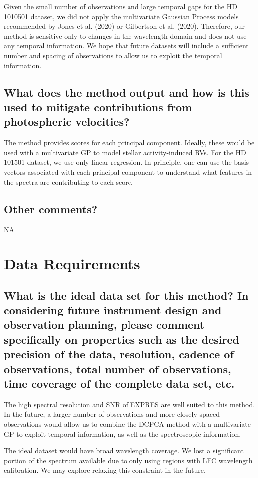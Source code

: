 \documentclass[12pt]{article}
\begin{document}
Given the small number of observations and large temporal gaps for the HD 1010501 dataset, we did not apply the multivariate Gaussian Process models recommended by Jones et al. (2020) or Gilbertson et al. (2020).
Therefore, our method is sensitive only to changes in the wavelength domain and does not use any temporal information.
We hope that future datasets will include a sufficient number and spacing of observations to allow us to exploit the temporal information.

\subsection{What does the method output and how is this used to mitigate contributions from photospheric velocities?}

The method provides scores for each principal component.  Ideally, these would be used with a multivariate GP to model stellar activity-induced RVs.  For the HD 101501 dataset, we use only linear regression.
In principle, one can use the basis vectors associated with each principal component to understand what features in the spectra are contributing to each score.

\subsection{Other comments?}

NA

\section{Data Requirements}
\subsection{What is the ideal data set for this method?  In considering future instrument design and observation planning, please comment specifically on properties such as the desired precision of the data, resolution, cadence of observations, total number of observations, time coverage of the complete data set, etc.}

The high spectral resolution and SNR of EXPRES are well suited to this method.  In the future, a larger number of observations and more closely spaced observations would allow us to combine the DCPCA method with a multivariate GP to exploit temporal information, as well as the spectroscopic information.

The ideal dataset would have broad wavelength coverage.
We lost a significant portion of the spectrum available due to only using regions with LFC wavelength calibration.
We may explore relaxing this constraint in the future.
\end{document}
